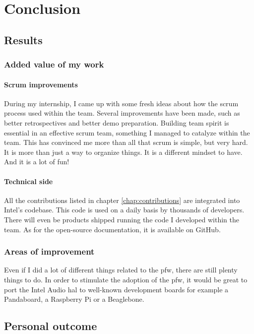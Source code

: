 \chapter{Conclusion}

\section{Results}

\subsection{Added value of my work}
\subsubsection{Scrum improvements}
During my internship, I came up with some fresh ideas about how the \gls{scrum} process used within the team.
Several improvements have been made, such as better retrospectives and better demo preparation.
Building team spirit is essential in an effective \gls{scrum} team, something I managed to catalyze within the team.
This has convinced me more than all that \gls{scrum} is simple, but very hard. It is more than just a way to organize
things. It is a different mindset to have. And it is a lot of fun!

\subsubsection{Technical side}
All the contributions listed in chapter \ref{chap:contributions} are integrated into Intel's codebase.
This code is used on a daily basis by thousands of developers. There will even be products shipped running the
code I developed within the team.
As for the open-source documentation, it is available on \gls{GitHub}.

\subsection{Areas of improvement}
Even if I did a lot of different things related to the \gls{pfw}, there are still plenty things to do.
In order to stimulate the adoption of the \gls{pfw}, it would be great to
port the Intel Audio \gls{hal} to well-known development boards for example a
Pandaboard, a Raspberry Pi or a Beaglebone.


\section{Personal outcome}

